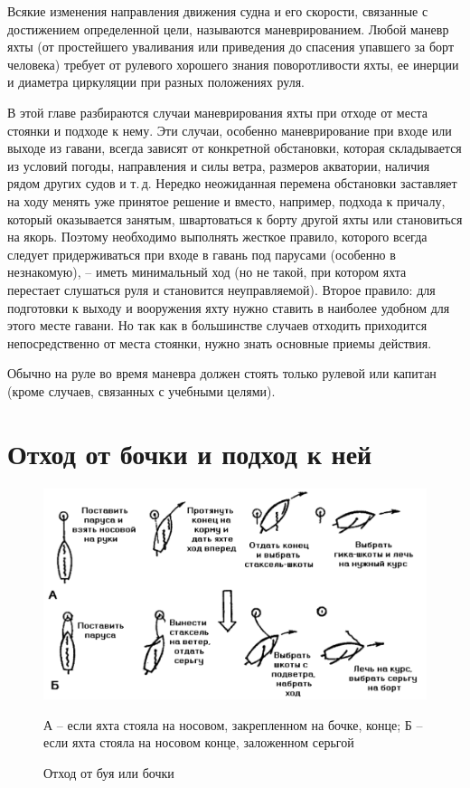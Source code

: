 \documentclass[a4paper, 12pt, twoside, final]{scrbook}
\begin{document}
Всякие изменения направления движения судна и его скорости, связанные с достижением определенной цели, называются маневрированием. Любой маневр яхты (от простейшего уваливания или приведения до спасения упавшего за борт человека) требует от рулевого хорошего знания поворотливости яхты, ее инерции и диаметра циркуляции при разных положениях руля.

В этой главе разбираются случаи маневрирования яхты при отходе от места стоянки и подходе к нему. Эти случаи, особенно маневрирование при входе или выходе из гавани, всегда зависят от конкретной обстановки, которая складывается из условий погоды, направления и силы ветра, размеров акватории, наличия рядом других судов и т.\,д. Нередко неожиданная перемена обстановки заставляет на ходу менять уже принятое решение и вместо, например, подхода к причалу, который оказывается занятым, швартоваться к борту другой яхты или становиться на якорь. Поэтому необходимо выполнять жесткое правило, которого всегда следует придерживаться при входе в гавань под парусами (особенно в незнакомую), \--- иметь минимальный ход (но не такой, при котором яхта перестает слушаться руля и становится неуправляемой). Второе правило: для подготовки к выходу и вооружения яхту нужно ставить в наиболее удобном для этого месте гавани. Но так как в большинстве случаев отходить приходится непосредственно от места стоянки, нужно знать основные приемы действия.

Обычно на руле во время маневра должен стоять только рулевой или капитан (кроме случаев, связанных с учебными целями).

\section{Отход от бочки и подход к ней}

\begin{figure}[htbp]
   \centering
   \includegraphics{122_Othod_ot_bochki} %
   \caption{Отход от буя или бочки}
   \label{fig:122}
   \centering\small
   А \--- если яхта стояла на носовом, закрепленном на бочке, конце; Б \--- если яхта стояла на носовом конце, заложенном серьгой
\end{figure}
\end{document}
